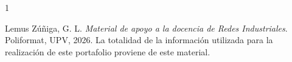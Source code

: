 
\begin{thebibliography}{1}

   Lemus Zúñiga, G. L.
   \newblock \textit{Material de apoyo a la docencia de Redes Industriales}.
   \newblock Poliformat, UPV, 2026.
   \newblock La totalidad de la información utilizada para la realización de este portafolio proviene de este material.

\end{thebibliography}
\cleardoublepage
